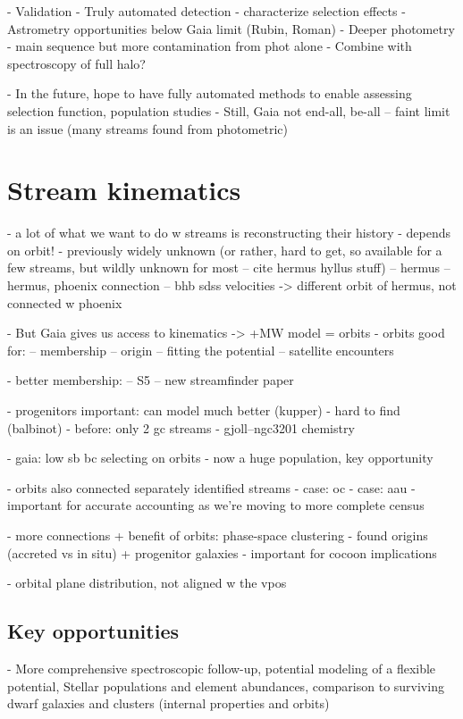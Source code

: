 \documentclass[final,5p,times,twocolumn,authoryear]{elsarticle}
\begin{document}
- Validation
- Truly automated detection - characterize selection effects
- Astrometry opportunities below Gaia limit (Rubin, Roman)
- Deeper photometry - main sequence but more contamination from phot alone
    - Combine with spectroscopy of full halo?

- In the future, hope to have fully automated methods to enable assessing selection function, population studies
- Still, Gaia not end-all, be-all -- faint limit is an issue (many streams found from photometric)


\section{Stream kinematics}
\label{sec:orbits}
- a lot of what we want to do w streams is reconstructing their history
- depends on orbit!
- previously widely unknown (or rather, hard to get, so available for a few streams, but wildly unknown for most -- cite hermus hyllus stuff)
-- hermus \citep{grillmair:2014}
-- hermus, phoenix connection \citep{gc:2016}
-- bhb sdss velocities -> different orbit of hermus, not connected w phoenix \citep{martin:2018}

- But Gaia gives us access to kinematics -> +MW model = orbits
- orbits good for:
-- membership
-- origin
-- fitting the potential
-- satellite encounters

- better membership:
-- S5 \citep{li:2022}
-- new streamfinder paper


- progenitors important: can model much better (kupper)
- hard to find (balbinot)
- before: only 2 gc streams
- gjoll--ngc3201 chemistry \citep{hansen:2020}

- gaia: low sb bc selecting on orbits
- now a huge population, key opportunity

- orbits also connected separately identified streams
- case: oc
- case: aau \citep{li:2021}
- important for accurate accounting as we're moving to more complete census

- more connections + benefit of orbits: phase-space clustering \citep{bonaca:2021}
- found origins (accreted vs in situ) + progenitor galaxies
- important for cocoon implications

- orbital plane distribution, not aligned w the vpos \citep{riley:2020}

\subsection{Key opportunities}
- More comprehensive spectroscopic follow-up, potential modeling of a flexible potential, Stellar populations and element abundances, comparison to surviving dwarf galaxies and clusters (internal properties and orbits)
\end{document}
